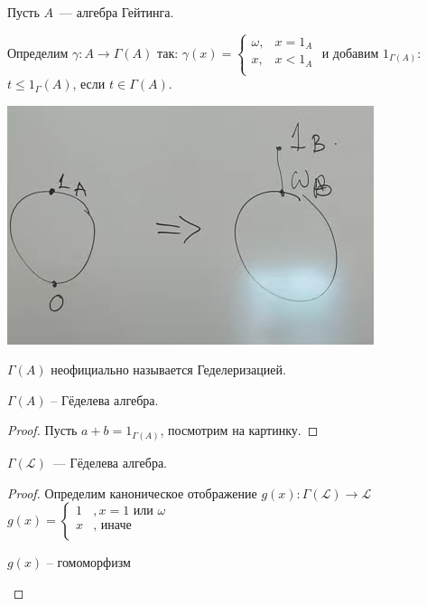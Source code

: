 \begin{definition}
    [$\Gamma (A)$]    
    Пусть $A$~--- алгебра Гейтинга.

    Определим $\gamma: A \to \Gamma(A)$ так:
    $\gamma(x) = \begin{cases}
        \omega, &x = 1_A\\
        x, & x < 1_A\\
    \end{cases}$
    и добавим $1_{\Gamma(A)}$: $t \leqslant 1_\Gamma(A)$, если $t \in \Gamma(A)$.    

    \begin{center}
        \includegraphics[scale=0.5]{img/gedelerisation.png}    
    \end{center}
\end{definition}

\begin{remark}
    $\Gamma (A)$ неофициально называется Геделеризацией.
\end{remark}

\begin{theorem}
  $\Gamma(A)$ -- Гёделева алгебра.  
\end{theorem}
\begin{proof}
    Пусть $a+b = 1_{\Gamma(A)}$, посмотрим на картинку.
\end{proof}

\begin{statement}
    $\Gamma(\mathcal L)$~--- Гёделева алгебра.
\end{statement}
\begin{proof}
    Определим каноническое отображение $g(x): \Gamma(\mathcal L) \to \mathcal L$\\ 
    $g(x) = \begin{cases}
        1&, x = 1 \text{ или } \omega\\
        x&, \text{ иначе}\\
    \end{cases} $
    \begin{statement}
        $g(x)$ -- гомоморфизм
    \end{statement}
    
\end{proof}

